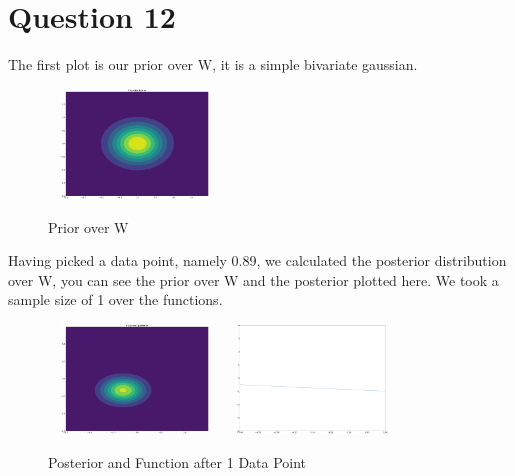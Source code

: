 \documentclass[a4paper, 9pt]{article}
\begin{document}
\section*{Question 12}
The first plot is our prior over W, it is a simple bivariate gaussian.\\
\newline
\begin{figure}[H]
\begin{center}
\includegraphics[width=1.8in,height=1.15in]{posterior0} \\
\end{center}
\caption{Prior over W}
\end{figure}
Having picked a data point, namely 0.89, we calculated the posterior distribution over W, you can see the prior over W and the posterior plotted here. We took a sample size of 1 over the functions.\\
\newline
\begin{figure}[H]
\begin{center}
\includegraphics[width=1.8in,height=1.15in]{posterior1}
\includegraphics[width=1.8in,height=1.15in]{data1} \\
\end{center}
\caption{Posterior and Function after 1 Data Point}
\end{figure}
\end{document}
